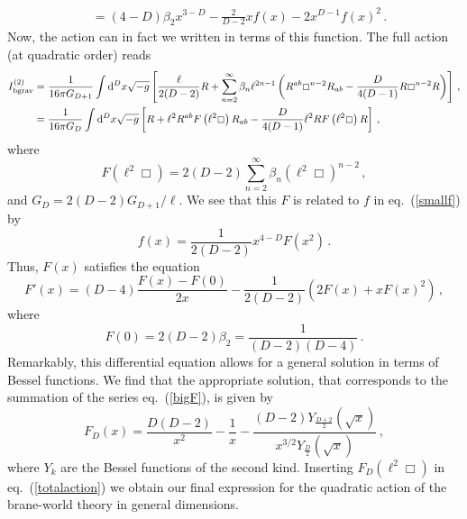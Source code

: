 \documentclass[11pt]{article}
\newcommand{\req}[1]{(\ref{#1})} %
\newcommand{\diff}{\mathrm{d}}
\renewcommand{\req}[1]{eq.~(\ref{#1})}
\begin{document}
{\begin{equation}
\begin{aligned}
&=(4-D)\beta_{2} x^{3-D}-\frac{2}{D-2}x f(x)-2 x^{D-1} f(x)^2\, .
\end{aligned}
\end{equation}
Now, the action can in fact we written in terms of this function. The full action (at quadratic order) reads
\begin{align}\notag
I_{\rm bgrav}^{(2)}&=\frac{1}{16\pi G_{D+1}}\int  \diff^{D}x\sqrt{-g}\left[\frac{\ell}{2(D-2)}R+\sum_{n=2}^{\infty}\beta_{n}\ell^{2n-1}\left(R^{ab}\Box^{n-2}R_{ab}-\frac{D}{4(D-1)}R\Box^{n-2} R\right)\right]\, ,\\
&=\frac{1}{16\pi G_{D}}\int  \diff^{D}x\sqrt{-g}\left[R+\ell^2 R^{ab}F\left(\ell^2\Box\right)R_{ab}-\frac{D}{4(D-1)}\ell^2 RF\left(\ell^2\Box\right)R\right]\, ,\label{totalaction}
\end{align}
where 
\begin{equation}\label{bigF}
F(\ell^2\Box)=2(D-2)\sum_{n=2}^{\infty}\beta_{n}\left(\ell^2\Box\right)^{n-2}\, ,
\end{equation}
and $G_{D}=2(D-2)G_{D+1}/\ell$. We see that this $F$ is related to $f$ in \req{smallf} by 
\begin{equation}
f(x)=\frac{1}{2(D-2)}x^{4-D}F(x^2)\, .
\end{equation}
Thus, $F(x)$ satisfies the equation
\begin{equation}
F'(x)=(D-4)\frac{F(x)-F(0)}{2x}-\frac{1}{2(D-2)}\left(2F(x)+x F(x)^2\right)\, ,
\end{equation}
where 
\begin{equation}
F(0)=2(D-2)\beta_2=\frac{1}{(D-2)(D-4)}\, .
\end{equation}
Remarkably, this differential equation allows for a general solution in terms of Bessel functions. We find that the appropriate solution, that corresponds to the summation of the series \req{bigF}, is given by 
\begin{equation}
F_{D}(x)=\frac{D(D-2)}{x^2}-\frac{1}{x}-\frac{(D-2)Y_{\frac{D+2}{2}}\left(\sqrt{x}\right)}{x^{3/2}Y_{\frac{D}{2}}\left(\sqrt{x}\right)}\, ,
\end{equation}
where $Y_{k}$ are the Bessel functions of the second kind. Inserting $F_{D}(\ell^2 \Box)$ in \req{totalaction} we obtain our final expression for the quadratic action of the brane-world theory in general dimensions. 



}
\end{document}
